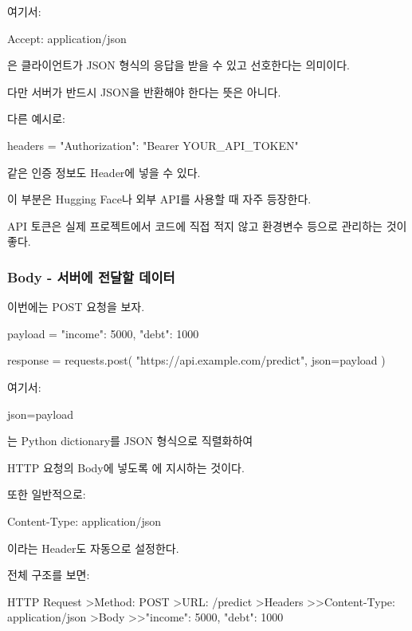여기서:

\begin{dhkzsh}
Accept: application/json
\end{dhkzsh}

은 클라이언트가 JSON 형식의 응답을 받을 수 있고 선호한다는 의미이다.

다만 서버가 반드시 JSON을 반환해야 한다는 뜻은 아니다.

다른 예시로:

\begin{dhkzsh}
headers = {
    "Authorization": "Bearer YOUR_API_TOKEN"
}
\end{dhkzsh}

같은 인증 정보도 Header에 넣을 수 있다.

이 부분은 Hugging Face나 외부 API를 사용할 때 자주 등장한다.

API 토큰은 실제 프로젝트에서 코드에 직접 적지 않고 환경변수 등으로 관리하는 것이 좋다.

\subsubsection{Body - 서버에 전달할 데이터}

이번에는 POST 요청을 보자.

\begin{dhkcode}
payload = {
    "income": 5000,
    "debt": 1000
}

response = requests.post(
    "https://api.example.com/predict",
    json=payload
)
\end{dhkcode}

여기서:

\begin{dhkzsh}
json=payload
\end{dhkzsh}

는 Python dictionary를 JSON 형식으로 직렬화하여

HTTP 요청의 Body에 넣도록 에 지시하는 것이다.

또한 일반적으로:

\begin{dhkzsh}
Content-Type: application/json
\end{dhkzsh}

이라는 Header도 자동으로 설정한다.

전체 구조를 보면:

\begin{dhkdir}[in=6]
HTTP Request
>Method: POST
>URL: /predict
>Headers
>>Content-Type: application/json
>Body
>>{"income": 5000, "debt": 1000}
\end{dhkdir}

